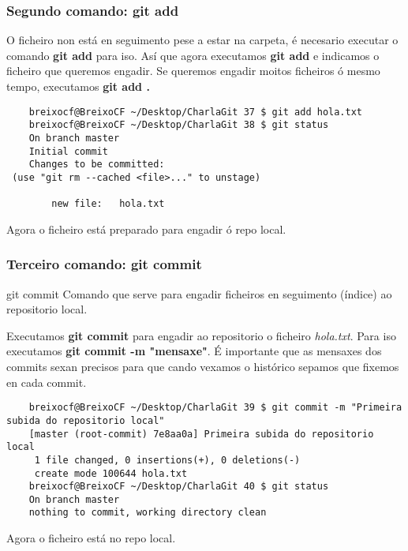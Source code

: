 \begin{frame}[fragile]
  \frametitle{Segundo comando: git add}
  O ficheiro non está en seguimento pese a estar na carpeta, é necesario executar o comando \textbf{git add} para iso. Así que agora executamos \textbf{git add} e indicamos o ficheiro que queremos engadir. Se queremos engadir moitos ficheiros ó mesmo tempo, executamos \textbf{git add .}
  \tiny 
\begin{verbatim}
	breixocf@BreixoCF ~/Desktop/CharlaGit 37 $ git add hola.txt 
	breixocf@BreixoCF ~/Desktop/CharlaGit 38 $ git status
	On branch master
	Initial commit
	Changes to be committed:
 (use "git rm --cached <file>..." to unstage)
	
		new file:   hola.txt
\end{verbatim}
  \small
  Agora o ficheiro está preparado para engadir ó repo local.
\end{frame}

\begin{frame}[fragile]
  \frametitle{Terceiro comando: git commit}
  \begin{block}{git commit}
    Comando que serve para engadir ficheiros en seguimento (índice) ao repositorio local.
  \end{block}
  \small
  Executamos \textbf{git commit} para engadir ao repositorio o ficheiro \textit{hola.txt}. Para iso executamos \textbf{git commit -m "mensaxe"}. É importante que as mensaxes dos commits sexan precisos para que cando vexamos o histórico sepamos que fixemos en cada commit.
  \tiny 
\begin{verbatim}
	breixocf@BreixoCF ~/Desktop/CharlaGit 39 $ git commit -m "Primeira subida do repositorio local"
	[master (root-commit) 7e8aa0a] Primeira subida do repositorio local
	 1 file changed, 0 insertions(+), 0 deletions(-)
	 create mode 100644 hola.txt
	breixocf@BreixoCF ~/Desktop/CharlaGit 40 $ git status
	On branch master
	nothing to commit, working directory clean
\end{verbatim}
  \small
  Agora o ficheiro está no repo local.
\end{frame}

